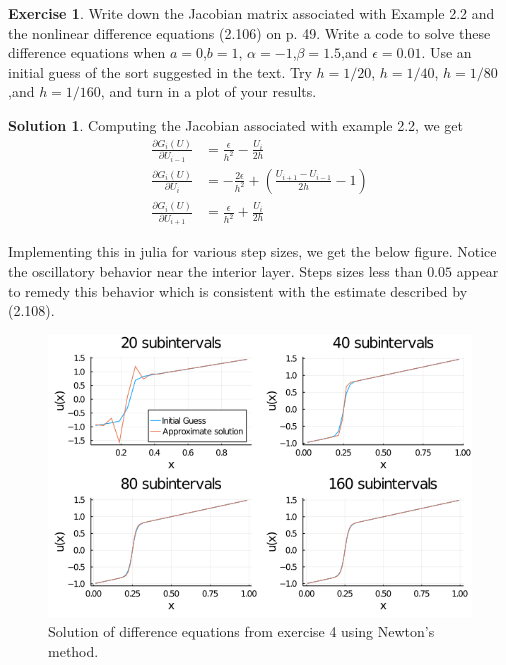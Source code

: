 \documentclass[12pt]{article}
\theoremstyle{definition}
\newtheorem{exer}{Exercise}
\newtheorem{sol}{Solution}
\theoremstyle{remark}
\begin{document}
\newpage

\begin{exer}
Write down the Jacobian matrix associated with Example 2.2 and the nonlinear difference equations (2.106) on p. 49. Write a code to solve these difference equations when $a=0$,$b=1$, $\alpha=-1$,$\beta=1.5$,and $\epsilon=0.01$. Use an initial guess of the sort suggested in the text. Try $h=1 / 20$, $h=1 / 40$, $h=1 / 80$,and $h=1 / 160$, and turn in a plot of your results.
\end{exer}

\begin{sol}
    Computing the Jacobian associated with example 2.2, we get 
    \begin{align*}
        \frac{\partial G_{i}(U)}{\partial U_{i-1}} &= \frac{\epsilon}{h^{2}} - \frac{U_{i}}{2h} \\
        \frac{\partial G_{i}(U)}{\partial U_{i}}  &= -\frac{2\epsilon}{h^{2}} + \left( \frac{U_{i+1} - U_{i-1}}{2h} - 1\right)\\
        \frac{\partial G_{i}(U)}{\partial U_{i+1}} &= \frac{\epsilon}{h^{2}} + \frac{U_{i}}{2h}
    \end{align*}

    Implementing this in julia for various step sizes, we get the below figure. Notice the oscillatory behavior near the interior layer. Steps sizes less than $ 0.05$ appear to remedy this behavior which is consistent with the estimate described by (2.108).
\end{sol}

\begin{figure}[ht]
    \centering
    \includegraphics[width=0.8\linewidth]{figs/hw-3-exer-4.png}
    \caption{Solution of difference equations from exercise 4 using Newton's method.}
    \label{fig:figs/hw-3-exer-4}
\end{figure}
\newpage
\end{document}
